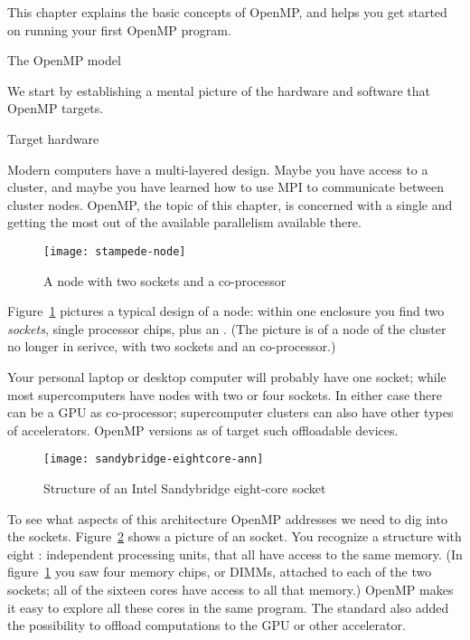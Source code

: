 
This chapter explains the basic concepts of OpenMP, and helps you get
started on running your first OpenMP program.

 {The OpenMP model}

We start by establishing a mental picture of the hardware and software
that OpenMP targets.

 {Target hardware}

Modern computers have a multi-layered design. Maybe you have access to
a cluster, and maybe you have learned how to use MPI to communicate
between cluster nodes.
OpenMP, the topic of this chapter,
is concerned with a single 
and getting the most out of the available parallelism available there.

\begin{figure}[ht]
\texttt{[image: stampede-node]}
\caption{A node with two sockets and a co-processor}
\label{fig:stampedenode}
\end{figure}
%
Figure~\ref{fig:stampedenode} pictures a typical design of a node:
within one enclosure you find two \emph{sockets},
single processor chips, plus an .
(The picture is of a node of the  cluster
no longer in serivce, with two
sockets and an  co-processor.)

Your personal laptop or desktop computer will probably
have one socket;
while most supercomputers have nodes with two or four sockets.
In either case there can be a \ac{GPU} as co-processor;
supercomputer clusters can also have other types of accelerators.
OpenMP versions as of  target such offloadable devices.

\begin{figure}[ht]
  \texttt{[image: sandybridge-eightcore-ann]}
  \caption{Structure of an Intel Sandybridge eight-core socket}
  \label{fig:sandybridge}
\end{figure}
%
To see what aspects of this architecture OpenMP addresses
we need to dig into the sockets.
Figure~\ref{fig:sandybridge} shows a picture of an
 socket. You recognize a structure
with eight : independent processing
units, that all have access to the same memory.
(In
figure~\ref{fig:stampedenode} you saw four memory chips,
or DIMMs,
attached to
each of the two sockets; all of the sixteen cores have access to all
that memory.)
OpenMP makes it easy to explore all these cores in the same program.
The  standard also added the possibility
to offload computations to the GPU or other accelerator.

